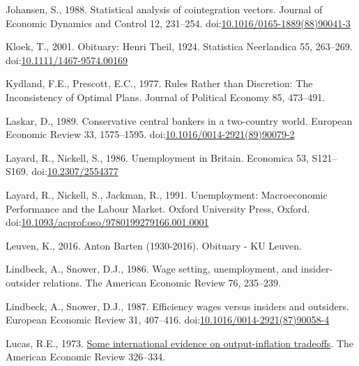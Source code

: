 \documentclass[
  12pt,
  onecolumn]{article}
\newlength{\cslhangindent}
\newlength{\cslentryspacingunit} %
\newenvironment{CSLReferences}[2] %
 {%
  \setlength{\parindent}{0pt}
  \ifodd #1
  \let\oldpar\par
  \def\par{\hangindent=\cslhangindent\oldpar}
  \fi
  \setlength{\parskip}{#2\cslentryspacingunit}
 }%
 {}
\begin{document}
\begin{CSLReferences}{1}{0}
\leavevmode{}%
Johansen, S., 1988. Statistical analysis of cointegration vectors. Journal of Economic Dynamics and Control 12, 231--254. doi:\href{https://doi.org/10.1016/0165-1889(88)90041-3}{10.1016/0165-1889(88)90041-3}

\leavevmode{}%
Kloek, T., 2001. Obituary: {Henri Theil}, 1924. Statistica Neerlandica 55, 263--269. doi:\href{https://doi.org/10.1111/1467-9574.00169}{10.1111/1467-9574.00169}

\leavevmode{}%
Kydland, F.E., Prescott, E.C., 1977. Rules {Rather} than {Discretion}: {The Inconsistency} of {Optimal Plans}. Journal of Political Economy 85, 473--491.

\leavevmode{}%
Laskar, D., 1989. Conservative central bankers in a two-country world. European Economic Review 33, 1575--1595. doi:\href{https://doi.org/10.1016/0014-2921(89)90079-2}{10.1016/0014-2921(89)90079-2}

\leavevmode{}%
Layard, R., Nickell, S., 1986. Unemployment in {Britain}. Economica 53, S121--S169. doi:\href{https://doi.org/10.2307/2554377}{10.2307/2554377}

\leavevmode{}%
Layard, R., Nickell, S., Jackman, R., 1991. Unemployment: {Macroeconomic Performance} and the {Labour Market}. {Oxford University Press}, {Oxford}. doi:\href{https://doi.org/10.1093/acprof:oso/9780199279166.001.0001}{10.1093/acprof:oso/9780199279166.001.0001}

\leavevmode{}%
Leuven, K., 2016. Anton {Barten} (1930-2016). Obituary - KU Leuven.

\leavevmode{}%
Lindbeck, A., Snower, D.J., 1986. Wage setting, unemployment, and insider-outsider relations. The American Economic Review 76, 235--239.

\leavevmode{}%
Lindbeck, A., Snower, D.J., 1987. Efficiency wages versus insiders and outsiders. European Economic Review 31, 407--416. doi:\href{https://doi.org/10.1016/0014-2921(87)90058-4}{10.1016/0014-2921(87)90058-4}

\leavevmode{}%
Lucas, R.E., 1973. \href{http://www.jstor.org/stable/1914364}{Some international evidence on output-inflation tradeoffs}. The American Economic Review 326--334.


\end{CSLReferences}
\end{document}
